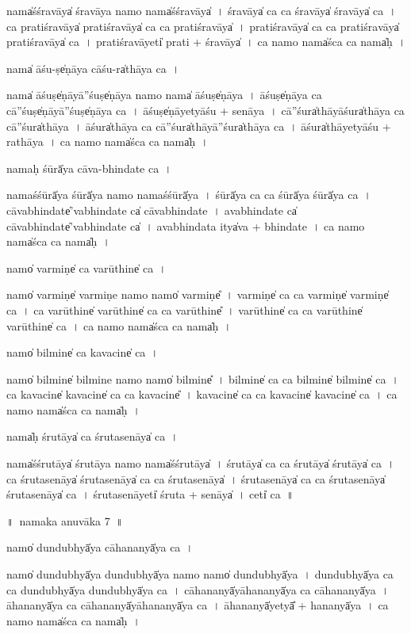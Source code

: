 \documentclass[parskip, DIV=14]{scrartcl}
\begin{document}
{nama̍śśra॒vāya̍ śra॒vāya॒ namo॒ nama̍śśra॒vāya̍~।
śra॒vāya̍ ca ca śra॒vāya̍ śra॒vāya̍ ca~।
ca॒ pra॒ti॒śra॒vāya̍ pratiśra॒vāya̍ ca ca pratiśra॒vāya̍~।
pra॒ti॒śra॒vāya̍ ca ca pratiśra॒vāya̍ pratiśra॒vāya̍ ca~।
pra॒ti॒śra॒vāyeti̍ prati + śra॒vāya̍~।
ca॒ namo॒ nama̍śca ca॒ nama̍ḥ~।

nama̍ ā॒śu-ṣe̍ṇāya cā॒śu-ra̍thāya ca॒~।

nama̍ ā॒śuṣe̍ṇāyā॒''śuṣe̍ṇāya॒ namo॒ nama̍ ā॒śuṣe̍ṇāya~।
ā॒śuṣe̍ṇāya ca cā॒''śuṣe̍ṇāyā॒''śuṣe̍ṇāya ca~।
ā॒śuṣe̍ṇā॒yetyā॒śu + se॒nā॒ya॒~।
cā॒''śura̍thāyā॒śura̍thāya ca cā॒''śura̍thāya~।
ā॒śura̍thāya ca cā॒''śura̍thāyā॒''śura̍thāya ca~।
āśura̍thā॒yetyā॒śu + ra॒thā॒ya॒~।
ca॒ namo॒ nama̍śca ca॒ nama̍ḥ~।

nama॒ḥ śūrā̍ya cāva-bhinda॒te ca॒~।

nama॒śśūrā̍ya॒ śūrā̍ya॒ namo॒ nama॒śśūrā̍ya~।
śūrā̍ya ca ca॒ śūrā̍ya॒ śūrā̍ya ca~।
cā॒va॒bhi॒nda॒te̍'vabhinda॒te  ca̍ cāvabhinda॒te~।
a॒va॒bhi॒nda॒te ca̍ cāvabhinda॒te̍'vabhinda॒te ca̍~।
a॒va॒bhi॒nda॒ta itya̍va + bhi॒nda॒te~।
ca॒ namo॒ nama̍śca ca॒ nama̍ḥ~।


namo̍ va॒rmiṇe̍ ca varū॒thine̍ ca~।

namo̍ va॒rmiṇe̍ va॒rmiṇe॒ namo॒ namo̍ va॒rmiṇe̎~।
va॒rmiṇe̍ ca ca va॒rmiṇe̍ va॒rmiṇe̍ ca~।
ca॒ va॒rū॒thine̍ varū॒thine̍ ca ca varū॒thine̎~।
va॒rū॒thine̍ ca ca varū॒thine̍ varū॒thine̍ ca~।
ca॒ namo॒ nama̍śca ca॒ nama̍ḥ~।

namo̍ bi॒lmine̍ ca kava॒cine̍ ca॒~।

namo̍ bi॒lmine̍ bi॒lmine॒ namo॒ namo̍ bi॒lmine̎~।
bi॒lmine̍ ca ca bi॒lmine̍ bi॒lmine̍ ca~।
ca॒ ka॒va॒cine̍ kava॒cine̍ ca ca kava॒cine̎~।
ka॒va॒cine̍ ca ca kava॒cine̍ kava॒cine̍ ca~।
ca॒ namo॒ nama̍śca ca॒ nama̍ḥ~।

nama̍ḥ śru॒tāya̍ ca śrutase॒nāya̍ ca~।

nama̍śśru॒tāya̍ śru॒tāya॒ namo॒ nama̍śśru॒tāya̍~।
śru॒tāya̍ ca ca śru॒tāya̍ śru॒tāya̍ ca~।
ca॒ śru॒ta॒se॒nāya̍  śrutase॒nāya̍ ca ca śrutase॒nāya̍~।
śru॒ta॒se॒nāya̍ ca ca śrutase॒nāya̍ śrutase॒nāya̍ ca~।
śru॒ta॒se॒nāyeti̍ śruta + se॒nāya̍~।
ceti̍ ca~॥

\newpage
\LARGE
॥~namaka anuvāka 7~॥ 
\Large

namo̍ dundu॒bhyā̍ya cāhana॒nyā̍ya ca॒~।

namo̍ dundu॒bhyā̍ya dundu॒bhyā̍ya॒ namo॒ namo̍ dundu॒bhyā̍ya~।
du॒ndu॒bhyā̍ya ca ca dundu॒bhyā̍ya dundu॒bhyā̍ya ca~।
cā॒ha॒na॒nyā̍yāhana॒nyā̍ya ca cāhana॒nyā̍ya~।
ā॒ha॒na॒nyā̍ya ca cāhana॒nyā̍yāhana॒nyā̍ya ca~।
ā॒ha॒na॒nyā̍yetyā̎ + ha॒na॒nyā̍ya~।
ca॒ namo॒ nama̍śca ca॒ nama̍ḥ~।

}
\end{document}
